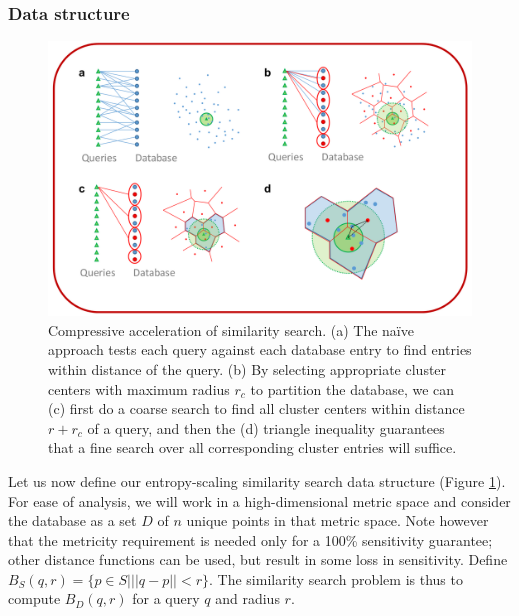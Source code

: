 \documentclass[review,preprint,12pt]{elsarticle}
\theoremstyle{definition}
\theoremstyle{remark}
\numberwithin{equation}{section}
\begin{document}
\subsubsection{Data structure}
\begin{figure}[btp]
    \centering
    \includegraphics[width=1\textwidth]{assets/dataStructure}
    \caption{ Compressive acceleration of similarity search. %
            (a) The na\"ive approach tests each query against each database entry to find entries within distance  of the query. %
            (b) By selecting appropriate cluster centers with maximum radius $r_c$ to partition the database, we can (c) first do a coarse search to find all cluster centers within distance $r+r_c$ of a query, and then the (d) triangle inequality guarantees that a fine search over all corresponding cluster entries will suffice.}
    \label{fig:dataStructure}
\end{figure}

Let us now define our entropy-scaling similarity search data structure (Figure \ref{fig:dataStructure}).
For ease of analysis, we will work in a high-dimensional metric space and consider the database as a set $D$ of $n$ unique points in that metric space.
Note however that the metricity requirement is needed only for a 100\% sensitivity guarantee; other distance functions can be used, but result in some loss in sensitivity.
Define $B_S(q,r) = \{ p \in S | ||q-p||<r \}$. The similarity search problem is thus to compute $B_D(q,r)$ for a query $q$ and radius $r$.
\end{document}
